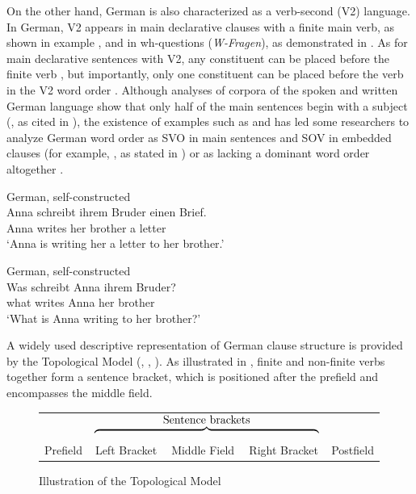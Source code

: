 On the other hand, German is also characterized as a verb-second (V2) language. In German, V2 appears in main declarative clauses with a finite main verb, as shown in example , and in wh-questions (\textit{W-Fragen}), as demonstrated in . As for main declarative sentences with V2, any constituent can be placed before the finite verb \citep{Muller2023}, but importantly, only one constituent can be placed before the verb in the V2 word order \citep{Czinglar2013}. Although analyses of corpora of the spoken and written German language show that only half of the main sentences begin with a subject (\citealt{HinrichsKübler2005}, as cited in \citealt{Czinglar2013}), the existence of examples such as  and  has led some researchers to analyze German word order as SVO in main sentences and SOV in embedded clauses (for example, \citealt{Bohn1983}, as stated in \citealt{Vikner2019}) or as lacking a dominant word order altogether \citealt{wals-81}.

 \ea 
    \label{ex:key:23} German, self-constructed \\
 \gll Anna  schreibt  ihrem  Bruder    einen  Brief.\\
  Anna  writes    her  brother    a  letter\\
\glt ‘Anna is writing her a letter to her brother.’ 
\z

\ea%
  \label{ex:key:24} German, self-constructed \\
\gll Was   schreibt Anna   ihrem   Bruder? \\
what  writes   Anna  her  brother\\
\glt ‘What is Anna writing to her brother?’ 
  \z

A widely used descriptive representation of German clause structure is provided by the Topological Model (\citealt{Drach1937}, \citealt{WollsteinEtAl2006}, \citealt{Wollstein-leisten2014, Wollstein2018}). As illustrated in , finite and non-finite verbs together form a sentence bracket, which is positioned after the prefield and encompasses the middle field.


\begin{figure} 
\begin{tabular}{ccccc}
 & \multicolumn{3}{c}{$\overbrace{\hspace{7cm}}^{\text{\normalsize Sentence brackets}}$} & \\
Prefield & Left Bracket & Middle Field & Right Bracket & Postfield \\
\end{tabular}
\caption{\label{fig:key:5}Illustration of the Topological Model}
\end{figure}

